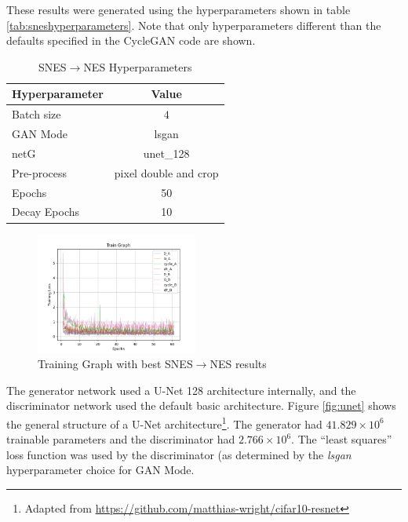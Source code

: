 \documentclass[10pt,twocolumn,letterpaper]{article}
\begin{document}
These results were generated using the hyperparameters shown in table \ref{tab:sneshyperparameters}. Note that only hyperparameters different than the defaults specified in the CycleGAN code are shown. 


\begin{table}[H]
   \begin{center}
      \begin{tabular}{|l|c|}
         \hline
         \textbf{Hyperparameter} & \textbf{Value} \\
         \hline\hline
         Batch size     & $4$ \\ 
         \hline
                  GAN Mode     & lsgan\\
         \hline
         netG       & unet\_128  \\ 
         \hline
         Pre-process     & pixel double and crop \\
         \hline
         Epochs     & 50 \\
         \hline
         Decay Epochs    & 10 \\
         \hline         
      \end{tabular}
   \end{center}
   \caption{SNES$\rightarrow$NES Hyperparameters}
   \label{tab:neshyperparameters}
\end{table}

\begin{figure}[H]
   \centering
   \includegraphics[width=0.475\textwidth]{figures/graphs/train_graph_nes.png}
   \caption{Training Graph with best SNES$\rightarrow$NES results}
   \label{fig:nesgraph}
\end{figure}

The generator network used a U-Net 128 architecture internally, and the discriminator network used the default basic architecture. Figure \ref{fig:unet} shows the general structure of a U-Net architecture\footnote{Adapted from \url{https://github.com/matthias-wright/cifar10-resnet}}. The generator had $41.829 \times 10^6$ trainable parameters and the discriminator had $2.766 \times 10^6$.
The ``least squares'' loss function was used by the discriminator (as determined by the \textit{lsgan} hyperparameter choice for GAN Mode.
\end{document}
